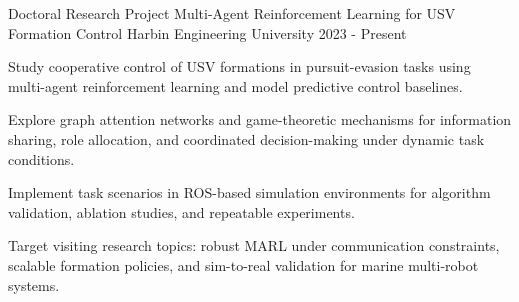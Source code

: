 

\begin{cventries}

  \cventry
    {Doctoral Research Project}
    {Multi-Agent Reinforcement Learning for USV Formation Control}
    {Harbin Engineering University}
    {2023 - Present}
    {
      \begin{cvitems}
        \item {Study cooperative control of USV formations in pursuit-evasion tasks using multi-agent reinforcement learning and model predictive control baselines.}
        \item {Explore graph attention networks and game-theoretic mechanisms for information sharing, role allocation, and coordinated decision-making under dynamic task conditions.}
        \item {Implement task scenarios in ROS-based simulation environments for algorithm validation, ablation studies, and repeatable experiments.}
        \item {Target visiting research topics: robust MARL under communication constraints, scalable formation policies, and sim-to-real validation for marine multi-robot systems.}
      \end{cvitems}
    }

\end{cventries}
